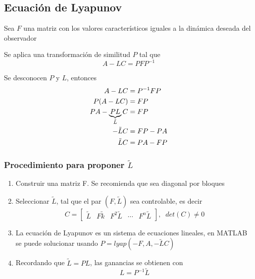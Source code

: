 \subsection{Ecuación de Lyapunov}

Sea \( F \) una matriz con los valores característicos iguales a la dinámica deseada del observador

Se aplica una transformación de similitud \( P \) tal que 
\[
    A-LC = PFP^{-1}
\]

Se desconocen \( P \) y \( L \), entonces
\[
    \begin{split}
        A-LC & = P^{-1}FP \\
        P(A-LC) & = FP \\
        PA - \underbrace{PL}_{\Tilde{L}}C & = FP\\
        -\tilde{L}C & = FP-PA \\
        \tilde{L}C & = PA-FP \\
    \end{split}
\]

\subsubsection{Procedimiento para proponer \( \tilde{L} \)}

\begin{enumerate}
    \item Construir una matriz F. Se recomienda que sea diagonal por bloques
    \item Seleccionar \( \tilde{L} \), tal que el par \( (F, \tilde{L}) \) sea controlable, es decir
        \[
            C = \begin{bmatrix}
                    \tilde{L} &
                    F\tilde{k} &
                    F^{2}\tilde{L} &
                    \cdots &
                    F^{n}\tilde{L}
                \end{bmatrix}, \;\;  det(C) \not= 0
        \]
    \item La ecuación de Lyapunov es un sistema de ecuaciones lineales, en MATLAB se puede solucionar usando \( P=lyap(-F, A, -\tilde{L}C) \)
    \item Recordando que \( \tilde{L} = PL \), las ganancias se obtienen con 
    \[
            L = P^{-1}\tilde{L}
    \]
\end{enumerate}